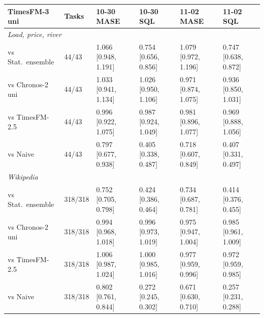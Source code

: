 \begin{tabular}{llllll}
\toprule
TimesFM-3 uni & Tasks & 10-30 MASE & 10-30 SQL & 11-02 MASE & 11-02 SQL \\
\midrule
\multicolumn{6}{l}{\textit{Load, price, river}} \\
vs Stat.\ ensemble & 44/43 & 1.066 [0.948, 1.191] & 0.754 [0.656, 0.856] & 1.079 [0.972, 1.196] & 0.747 [0.638, 0.872] \\
vs Chronos-2 uni & 44/43 & 1.033 [0.941, 1.134] & 1.026 [0.950, 1.106] & 0.971 [0.874, 1.075] & 0.936 [0.850, 1.031] \\
vs TimesFM-2.5 & 44/43 & 0.996 [0.922, 1.075] & 0.987 [0.924, 1.049] & 0.981 [0.896, 1.077] & 0.969 [0.888, 1.056] \\
vs Naive & 44/43 & 0.797 [0.677, 0.938] & 0.405 [0.338, 0.487] & 0.718 [0.607, 0.849] & 0.407 [0.331, 0.497] \\
\multicolumn{6}{l}{\textit{Wikipedia}} \\
vs Stat.\ ensemble & 318/318 & 0.752 [0.705, 0.798] & 0.424 [0.386, 0.464] & 0.734 [0.687, 0.781] & 0.414 [0.376, 0.455] \\
vs Chronos-2 uni & 318/318 & 0.994 [0.968, 1.018] & 0.996 [0.973, 1.019] & 0.975 [0.947, 1.004] & 0.985 [0.961, 1.009] \\
vs TimesFM-2.5 & 318/318 & 1.006 [0.987, 1.024] & 1.000 [0.985, 1.016] & 0.977 [0.959, 0.996] & 0.972 [0.959, 0.985] \\
vs Naive & 318/318 & 0.802 [0.761, 0.844] & 0.272 [0.245, 0.302] & 0.671 [0.630, 0.710] & 0.257 [0.231, 0.288] \\
\bottomrule
\end{tabular}
